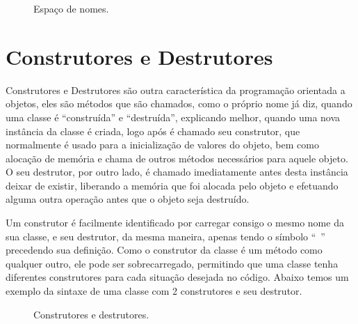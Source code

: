 \documentclass[rel_mlp]{iiufrgs}
\newcommand{\fonte}[1]{\\Fonte: {#1}}
\begin{document}
   \begin{figure}[htb]
       \centering
       \label{fig:figura6}
       \caption{Espaço de nomes.}
   \end{figure}

    \section{Construtores e Destrutores}
   Construtores e Destrutores são outra característica da programação orientada a objetos, eles são métodos que são chamados, como o próprio nome já diz, quando uma classe é “construída” e “destruída”, explicando melhor, quando uma nova instância da classe é criada, logo após é chamado seu construtor, que normalmente é usado para a inicialização de valores do objeto, bem como alocação de memória e chama de outros métodos necessários para aquele objeto. O seu destrutor, por outro lado, é chamado imediatamente antes desta instância deixar de existir, liberando a memória que foi alocada pelo objeto e efetuando alguma outra operação antes que o objeto seja destruído.

   	Um construtor é facilmente identificado por carregar consigo o mesmo nome da sua classe, e seu destrutor, da mesma maneira, apenas tendo o símbolo “~” precedendo sua definição. Como o construtor da classe é um método como qualquer outro, ele pode ser sobrecarregado, permitindo que uma classe tenha diferentes construtores para cada situação desejada no código. Abaixo temos um exemplo da sintaxe de uma classe com 2 construtores e seu destrutor.


   	\begin{figure}[htb]
       \centering
       \label{fig:figura7}
       \caption{Construtores e destrutores.}
   \end{figure}
\end{document}
